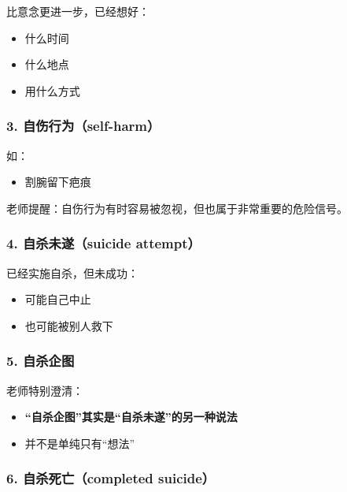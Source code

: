 \documentclass[
  chinese,
  9pt,
  a4paper,
]{ctexart}
\providecommand{\tightlist}{%
  \setlength{\itemsep}{0pt}\setlength{\parskip}{0pt}}
\begin{document}
比意念更进一步，已经想好：

\begin{itemize}
\tightlist
\item
  什么时间
\item
  什么地点
\item
  用什么方式
\end{itemize}

\subsubsection{3.
自伤行为（self-harm）}\label{ux81eaux4f24ux884cux4e3aself-harm}

如：

\begin{itemize}
\tightlist
\item
  割腕留下疤痕
\end{itemize}

老师提醒：自伤行为有时容易被忽视，但也属于非常重要的危险信号。

\subsubsection{4. 自杀未遂（suicide
attempt）}\label{ux81eaux6740ux672aux9042suicide-attempt}

已经实施自杀，但未成功：

\begin{itemize}
\tightlist
\item
  可能自己中止
\item
  也可能被别人救下
\end{itemize}

\subsubsection{5. 自杀企图}\label{ux81eaux6740ux4f01ux56fe}

老师特别澄清：

\begin{itemize}
\tightlist
\item
  \textbf{``自杀企图''其实是``自杀未遂''的另一种说法}
\item
  并不是单纯只有``想法''
\end{itemize}

\subsubsection{6. 自杀死亡（completed
suicide）}\label{ux81eaux6740ux6b7bux4ea1completed-suicide}
\end{document}
